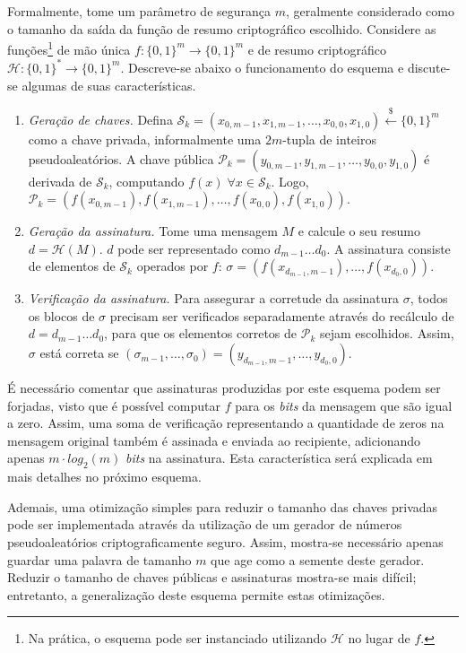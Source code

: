 \documentclass[12pt]{report}
\newcommand{\hh}{$\mathcal{H}$}
\newcommand{\pk}{$\mathcal{P}_k$}
\newcommand{\sk}{$\mathcal{S}_k$}
\newcommand{\binwds}[1]{\{0, 1\}^{#1}}
\begin{document}
Formalmente, tome um parâmetro de segurança $m$, geralmente considerado como
o tamanho da saída da função de resumo criptográfico escolhido. Considere as funções\footnote{Na prática, o esquema pode ser instanciado utilizando \hh{} no lugar de $f$.} de mão única
$f : \binwds{m} \longrightarrow \binwds{m}$
e de resumo criptográfico
$\mathcal{H} : \binwds{*} \longrightarrow \binwds{m}$.
Descreve-se abaixo o funcionamento do esquema
e discute-se algumas de suas características. 

\begin{enumerate}

    \item[] \emph{Geração de chaves.} Defina $\text{\sk{}} = (x_{0, m-1}, x_{1, m-1}, \dots, x_{0,0}, x_{1,0}) \stackrel{\$}{\longleftarrow} \binwds{m}$ como a chave privada, informalmente uma $2m$-tupla de inteiros pseudoaleatórios. A chave pública $\text{\pk{}} = (y_{0, m-1}, y_{1, m-1}, \dots, y_{0,0}, y_{1,0})$ é derivada de \sk{}, computando $f(x) \; \forall x \in  \text{\sk{}}$. Logo, $\text{\pk{}} = (f(x_{0, m-1}), f(x_{1, m-1}), \dots, f(x_{0,0}), f(x_{1,0}))$.

    \item[] \emph{Geração da assinatura.} Tome uma mensagem $M$ e calcule o seu resumo $d = \mathcal{H}(M)$. $d$ pode ser representado como $d_{m-1} \dots d_0$. A assinatura consiste de elementos de \sk{} operados por $f$: $\sigma = (f(x_{d_{m-1}, m-1}), \dots, f(x_{d_0, 0}))$.
    
    \item[] \emph{Verificação da assinatura.} Para assegurar a corretude da assinatura $\sigma$, todos os blocos de $\sigma$ precisam ser verificados separadamente através do recálculo de $d = d_{m-1} \dots d_0$, para que
    os elementos corretos de \pk{} sejam escolhidos. Assim, $\sigma$ está
    correta se $(\sigma_{m-1}, \dots, \sigma_0) = (y_{d_{m-1}, m-1}, \dots, y_{d_{0}, 0})$.
    
\end{enumerate}

É necessário comentar que assinaturas produzidas por este esquema podem ser
forjadas, visto que é possível computar $f$ para os \emph{bits} da mensagem
que são igual a zero. Assim, uma soma de verificação representando a
quantidade de zeros na mensagem original também é assinada e enviada ao
recipiente, adicionando apenas $m \cdot log_2(m)$ \emph{bits} na assinatura.
Esta característica será explicada em mais detalhes no próximo esquema.

Ademais, uma otimização simples para reduzir o tamanho das chaves privadas pode ser
implementada através da utilização de um gerador de números pseudoaleatórios
criptograficamente seguro. Assim, mostra-se necessário apenas guardar uma
palavra de tamanho $m$ que age como a semente deste gerador. Reduzir
o tamanho de chaves públicas e assinaturas mostra-se mais difícil; entretanto,
a generalização deste esquema permite estas otimizações.
\end{document}
